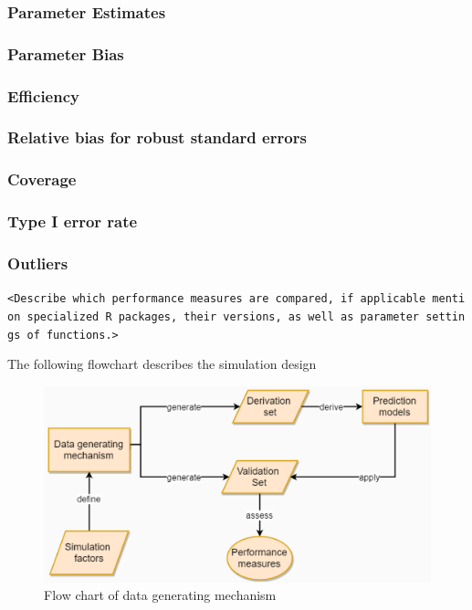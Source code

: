 \documentclass[10,a4paperpaper,]{article}
\begin{document}
\subsubsection{Parameter Estimates}
\subsubsection{Parameter Bias}
\subsubsection{Efficiency}
\subsubsection{Relative bias for robust standard errors}
\subsubsection{Coverage}
\subsubsection{Type I error rate}
\subsubsection{Outliers}

\texttt{\textless{}Describe\ which\ performance\ measures\ are\ compared,\ if\ applicable\ mention\ specialized\ R\ packages,\ their\ versions,\ as\ well\ as\ parameter\ settings\ of\ functions.\textgreater{}}

The following flowchart describes the simulation design

\begin{figure}
\includegraphics[width=450pt]{flowchart} \caption{Flow chart of data generating mechanism}\label{fig:unnamed-chunk-1}
\end{figure}
\end{document}
